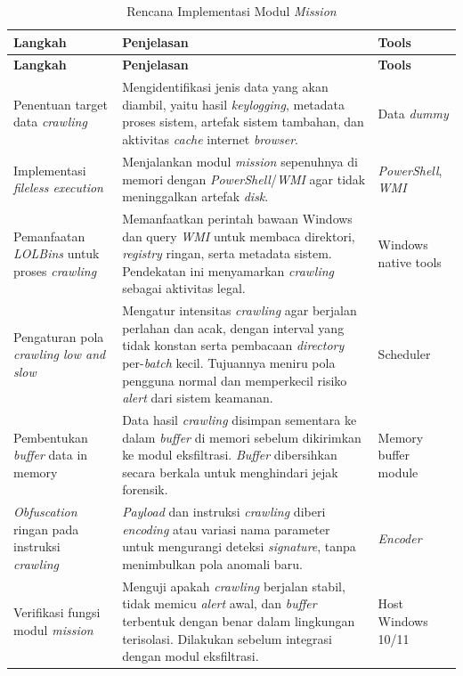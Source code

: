 \begin{longtable}{|p{3.5cm}|p{6cm}|p{3cm}|}
\caption{Rencana Implementasi Modul \textit{Mission}}
\label{tbl:rencana-mission} \\
\hline
\textbf{Langkah} & \textbf{Penjelasan} & \textbf{Tools} \\
\hline
\endfirsthead

\hline
\textbf{Langkah} & \textbf{Penjelasan} & \textbf{Tools} \\
\hline
\endhead

\hline
\endfoot

Penentuan target data \textit{crawling} &
Mengidentifikasi jenis data yang akan diambil, yaitu hasil \textit{keylogging}, metadata proses sistem, artefak sistem tambahan, dan aktivitas \textit{cache} internet \textit{browser}. &
Data \textit{dummy} \\
\hline

Implementasi \textit{fileless execution} &
Menjalankan modul \textit{mission} sepenuhnya di memori dengan \textit{PowerShell}/\textit{WMI} agar tidak meninggalkan artefak \textit{disk}. &
\textit{PowerShell}, \textit{WMI} \\
\hline

Pemanfaatan \textit{LOLBins} untuk proses \textit{crawling} &
Memanfaatkan perintah bawaan Windows dan query \textit{WMI} untuk membaca direktori, \textit{registry} ringan, serta metadata sistem. Pendekatan ini menyamarkan \textit{crawling} sebagai aktivitas legal. &
Windows native tools \\
\hline

Pengaturan pola \textit{crawling low and slow} &
Mengatur intensitas \textit{crawling} agar berjalan perlahan dan acak, dengan interval yang tidak konstan serta pembacaan \textit{directory} per-\textit{batch} kecil. Tujuannya meniru pola pengguna normal dan memperkecil risiko \textit{alert} dari sistem keamanan. &
Scheduler \\
\hline

Pembentukan \textit{buffer} data in memory &
Data hasil \textit{crawling} disimpan sementara ke dalam \textit{buffer} di memori sebelum dikirimkan ke modul eksfiltrasi. \textit{Buffer} dibersihkan secara berkala untuk menghindari jejak forensik. &
Memory buffer module \\
\hline

\textit{Obfuscation} ringan pada instruksi \textit{crawling} &
\textit{Payload} dan instruksi \textit{crawling} diberi \textit{encoding} atau variasi nama parameter untuk mengurangi deteksi \textit{signature}, tanpa menimbulkan pola anomali baru. &
\textit{Encoder} \\
\hline

Verifikasi fungsi modul \textit{mission} &
Menguji apakah \textit{crawling} berjalan stabil, tidak memicu \textit{alert} awal, dan \textit{buffer} terbentuk dengan benar dalam lingkungan terisolasi. Dilakukan sebelum integrasi dengan modul eksfiltrasi. &
Host Windows 10/11 \\
\hline

\end{longtable}
